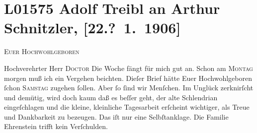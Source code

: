 

\section[Adolf Treibl an Arthur Schnitzler, {[}22.? 1. 1906{]}]{L01575 Adolf Treibl an Arthur Schnitzler, {[}22.? 1. 1906{]}}
\nopagebreak{}
\rehead{ }\normalsize\beginnumbering{}
\toendnotes[C]{\smallbreak\pagebreak[2]}
\toendnotes[C]{\smallbreak}
\pstart
           {\pb}\textsc{Euer Hochwohlgeboren}\pend
           
\pstart{}Hochverehrter Herr \textsc{Doctor}\pend\vspace{0.5em}
\pstart
           Die Woche fängt für mich gut an. Schon am \textsc{Montag}{ }morgen muß ich ein Vergehen beichten. Dieſer Brief hätte Euer
               Hochwohlgeboren ſchon \textsc{Samstag} zugehen ſollen. Aber ſo ſind wir Menſchen. Im Unglück zerknirſcht und
               demütig, wird doch {\pb}kaum daß es beſſer geht, der alte
               Schlendrian eingeſchlagen und die kleine, kleinliche Tagesarbeit erſcheint wichtiger,
               als Treue und Dankbarkeit zu bezeugen. Das iſt nur eine Selbſtanklage. Die Familie
                  Ehrenstein trifft kein
               Verſchulden.\pend
           
